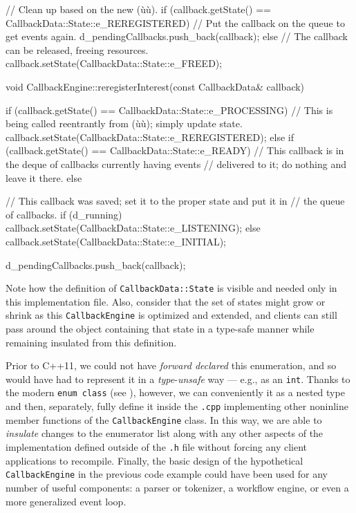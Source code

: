 \begin{emcppslisting}[emcppsbatch=e6]
{{{            // Clean up based on the new (ù{}ù).
            if (callback.getState() == CallbackData::State::e_REREGISTERED)
            {
                // Put the callback on the queue to get events again.
                d_pendingCallbacks.push_back(callback);
            }
            else
            {
                // The callback can be released, freeing resources.
                callback.setState(CallbackData::State::e_FREED);
            }
        }
    }
}

void CallbackEngine::reregisterInterest(const CallbackData& callback)
{
    if (callback.getState() == CallbackData::State::e_PROCESSING)
    {
        // This is being called reentrantly from (ù{}ù); simply update state.
        callback.setState(CallbackData::State::e_REREGISTERED);
    }
    else if (callback.getState() == CallbackData::State::e_READY)
    {
        // This callback is in the deque of callbacks currently having events
        // delivered to it; do nothing and leave it there.
    }
    else
    {
        // This callback was saved; set it to the proper state and put it in
        // the queue of callbacks.
        if (d_running)
        {
            callback.setState(CallbackData::State::e_LISTENING);
        }
        else
        {
            callback.setState(CallbackData::State::e_INITIAL);
        }

        d_pendingCallbacks.push_back(callback);
    }
}

\end{emcppslisting}

\noindent Note how the definition of \lstinline!CallbackData::State! is visible and
needed only in this implementation file. Also, consider that the set of
states might grow or shrink as this \lstinline!CallbackEngine! is optimized
and extended, and clients can still pass around the object containing
that state in a type-safe manner while remaining insulated from this
definition.

Prior to C++11, we could not have \emph{forward declared} this
enumeration, and so would have had to represent it in a
\emph{type}-\emph{unsafe} way --- e.g., as an \lstinline!int!. Thanks to
the modern \lstinline!enum!~\lstinline!class! (see ), however, we can
conveniently  it as a nested type and then,
separately, fully define it inside the \lstinline!.cpp! implementing other
noninline member functions of the \lstinline!CallbackEngine! class. In
this way, we are able to \emph{insulate} changes to the enumerator list
along with any other aspects of the implementation defined outside of
the \lstinline!.h! file without forcing any client applications to
recompile. Finally, the basic design of the hypothetical \lstinline!CallbackEngine!
in the previous code example could have been used for any number of
useful components: a parser or tokenizer, a workflow engine, or even a
more generalized event loop.

